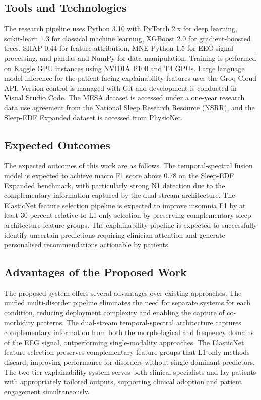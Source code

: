 \subsection{Tools and Technologies}

The research pipeline uses Python 3.10 with PyTorch 2.x for deep learning, scikit-learn 1.3 for classical machine learning, XGBoost 2.0 for gradient-boosted trees, SHAP 0.44 for feature attribution, MNE-Python 1.5 for EEG signal processing, and pandas and NumPy for data manipulation. Training is performed on Kaggle GPU instances using NVIDIA P100 and T4 GPUs. Large language model inference for the patient-facing explainability features uses the Groq Cloud API. Version control is managed with Git and development is conducted in Visual Studio Code. The MESA dataset is accessed under a one-year research data use agreement from the National Sleep Research Resource (NSRR), and the Sleep-EDF Expanded dataset is accessed from PhysioNet.

\subsection{Expected Outcomes}

The expected outcomes of this work are as follows. The temporal-spectral fusion model is expected to achieve macro F1 score above 0.78 on the Sleep-EDF Expanded benchmark, with particularly strong N1 detection due to the complementary information captured by the dual-stream architecture. The ElasticNet feature selection pipeline is expected to improve insomnia F1 by at least 30 percent relative to L1-only selection by preserving complementary sleep architecture feature groups. The explainability pipeline is expected to successfully identify uncertain predictions requiring clinician attention and generate personalised recommendations actionable by patients.

\subsection{Advantages of the Proposed Work}

The proposed system offers several advantages over existing approaches. The unified multi-disorder pipeline eliminates the need for separate systems for each condition, reducing deployment complexity and enabling the capture of co-morbidity patterns. The dual-stream temporal-spectral architecture captures complementary information from both the morphological and frequency domains of the EEG signal, outperforming single-modality approaches. The ElasticNet feature selection preserves complementary feature groups that L1-only methods discard, improving performance for disorders without single dominant predictors. The two-tier explainability system serves both clinical specialists and lay patients with appropriately tailored outputs, supporting clinical adoption and patient engagement simultaneously.

